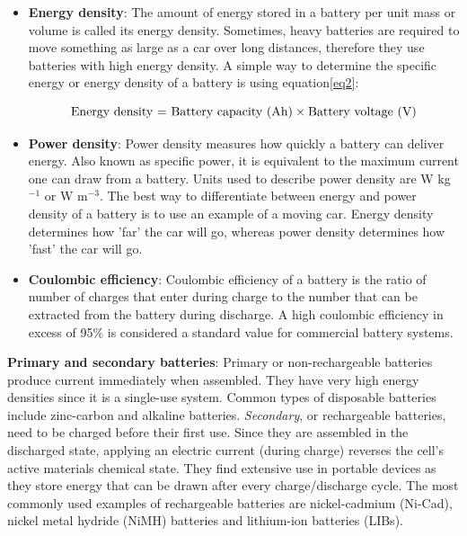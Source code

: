 \begin{itemize}
\item \textbf{Energy density}: The amount of energy stored in a battery per unit mass or volume is called its energy density. Sometimes, heavy batteries are required to move something as large as a car over long distances, therefore they use batteries with high energy density. A simple way to determine the specific energy or energy density of a battery is using equation\ref{eq2}:

\begin{equation} \label{eq2}
    \text{Energy density = } \text{Battery capacity (Ah)} \times \text{Battery voltage (V)}\\
\end{equation}

\item \textbf{Power density}: Power density measures how quickly a battery can deliver energy. Also known as specific power, it is equivalent to the maximum current one can draw from a battery. Units used to describe power density are W kg$^{-1}$ or W m$^{-3}$. The best way to differentiate between energy and power density of a battery is to use an example of a moving car. Energy density determines how 'far' the car will go, whereas power density determines how 'fast' the car will go.

\item \textbf{Coulombic efficiency}: Coulombic efficiency of a battery is the ratio of number of charges that enter during charge to the number that can be extracted from the battery during discharge. A high coulombic efficiency in excess of 95\% is considered a standard value for commercial battery systems. 
\end{itemize}

\textbf{Primary and secondary batteries}: Primary or non-rechargeable batteries produce current immediately when assembled. They have very high energy densities since it is a single-use system. Common types of disposable batteries include zinc-carbon and alkaline batteries. 
\textit{Secondary}, or rechargeable batteries, need to be charged before their first use. Since they are assembled in the discharged state, applying an electric current (during charge) reverses the cell's active materials chemical state. They find extensive use in portable devices as they store energy that can be drawn after every charge/discharge cycle. The most commonly used examples of rechargeable batteries are nickel-cadmium (Ni-Cad), nickel metal hydride (NiMH) batteries and lithium-ion batteries (LIBs).\\

